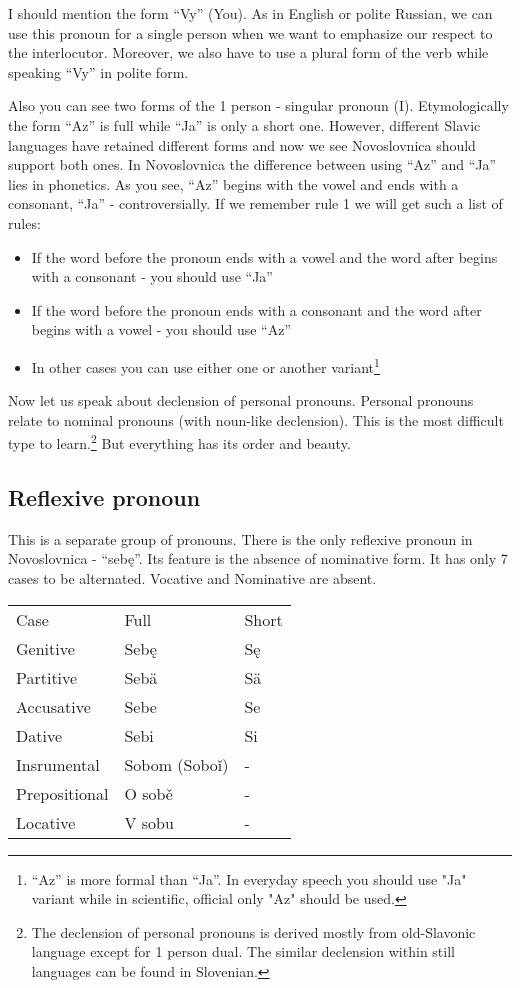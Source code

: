 I should mention the form “Vy” (You). As in English or polite Russian, we can use this pronoun for a single person when we want to emphasize our respect to the interlocutor. Moreover, we also have to use a plural form of the verb while speaking “Vy” in polite form.

Also you can see two forms of the 1 person - singular pronoun (I). Etymologically the form “Az” is full while “Ja” is only a short one. However, different Slavic languages have retained different forms and now we see Novoslovnica should support both ones. In Novoslovnica the difference between using “Az” and “Ja” lies in phonetics. As you see, “Az” begins with the vowel and ends with a consonant, “Ja” - controversially. If we remember rule 1 we will get such a list of rules:

\begin{itemize}
	\item If the word before the pronoun ends with a vowel and the word after begins with a consonant - you should use “Ja”
	\item If the word before the pronoun ends with a consonant and the word after begins with a vowel - you should use “Az”
	\item In other cases you can use either one or another variant\footnote{“Az” is more formal than “Ja”. In everyday speech you should use "Ja" variant while in scientific, official only "Az" should be used.}
\end{itemize}

Now let us speak about declension of personal pronouns. Personal pronouns relate to nominal pronouns (with noun-like declension). This is the most difficult type to learn.\footnote{The declension of personal pronouns is derived mostly from old-Slavonic language except for 1 person dual. The similar declension within still languages can be found in Slovenian.} But everything has its order and beauty.



\subsection{Reflexive pronoun}

This is a separate group of pronouns. There is the only reflexive pronoun in Novoslovnica - “sebę”. Its feature is the absence of nominative form. It has only 7 cases to be alternated. Vocative and Nominative are absent.

\begin{table}[!htb]
	\begin{tabular}{lll}
		Case & Full & Short \\
		Genitive & Sebę & Sę \\
		Partitive & Sebä & Sä \\
		Accusative & Sebe & Se \\
		Dative & Sebi & Si \\ 
		Insrumental & Sobom (Soboǐ) & - \\ 
		Prepositional & O sobě & - \\
		Locative & V sobu & -
	\end{tabular}
\end{table}


